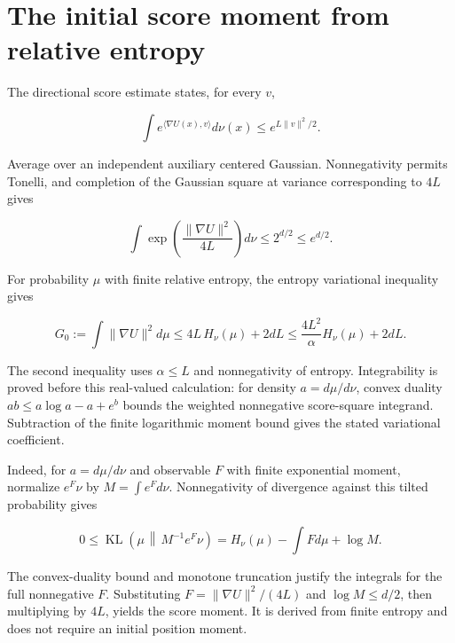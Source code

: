 \documentclass[11pt,a4paper]{article}
\begin{document}
\section{\texorpdfstring{The initial score moment from relative entropy}{The initial score moment from relative entropy}}


The directional score estimate \cite[Section~3.27.2]{LangevinLean2026ULASC} states, for every \(v\),

\[\int e^{\langle\nabla U(x),v\rangle}d\nu(x)\le e^{L\|v\|^2/2}.\]

Average over an independent auxiliary centered Gaussian. Nonnegativity permits Tonelli, and completion of the Gaussian square at variance corresponding to \(4L\) gives

\[\int\exp\!\left(\frac{\|\nabla U\|^2}{4L}\right)d\nu
\le 2^{d/2}\le e^{d/2}.\]

For probability \(\mu\) with finite relative entropy, the entropy variational inequality gives

\[G_0:=\int\|\nabla U\|^2d\mu\le4L\,H_\nu(\mu)+2dL
\le\frac{4L^2}{\alpha}H_\nu(\mu)+2dL.\]

The second inequality uses \(\alpha\le L\) and nonnegativity of entropy. Integrability is proved before this real-valued calculation: for density \(a=d\mu/d\nu\), convex duality \(ab\le a\log a-a+e^b\) bounds the weighted nonnegative score-square integrand. Subtraction of the finite logarithmic moment bound gives the stated variational coefficient.



Indeed, for \(a=d\mu/d\nu\) and observable \(F\) with finite exponential moment, normalize \(e^F\nu\) by \(M=\int e^Fd\nu\). Nonnegativity of divergence against this tilted probability gives

\[0\le\operatorname{KL}\left(\mu\,\middle\Vert\,M^{-1}e^F\nu\right)
=H_\nu(\mu)-\int Fd\mu+\log M.\]

The convex-duality bound and monotone truncation justify the integrals for the full nonnegative \(F\). Substituting \(F=\|\nabla U\|^2/(4L)\) and \(\log M\le d/2\), then multiplying by \(4L\), yields the score moment. It is derived from finite entropy and does not require an initial position moment.
\end{document}
